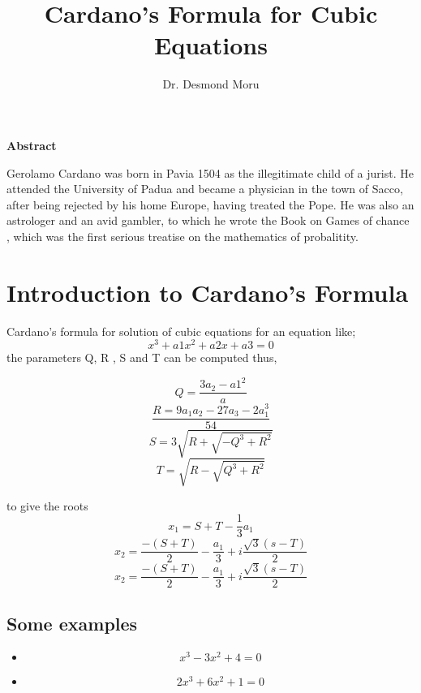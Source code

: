\documentclass{article}
\begin{document}
	\author{Dr. Desmond Moru}
	\title{Cardano's Formula for Cubic Equations}
	\maketitle
	
	
	
	\begin{center}
		\textbf{Abstract}
	\end{center}
	Gerolamo Cardano was born in Pavia 1504 as the illegitimate child of a jurist. He attended the University of Padua and became a physician in the town of Sacco, after being rejected by his home Europe, having treated the Pope. He was also an astrologer and an avid gambler, to which he wrote the Book on Games of chance , which was the first serious treatise on the mathematics of probalitity. \cite{cardanoformula}
	
	\section{ Introduction to Cardano's Formula}
	Cardano's formula for solution of cubic equations for an equation like;
	\begin{equation}
		x^3 + a1x^2 + a2x + a3 = 0
	\end{equation}
	the parameters Q, R , S and T can be computed thus,
	
	\begin{equation}
		Q= \frac{3a_{2} - a{1}^2}{a}
	\end{equation}
\begin{equation}
\frac{R=9a_{1}a_{2}-27a_{3}-2a_{1}^3}{54}	
\end{equation}
\begin{equation}
	S=3\sqrt{R +\sqrt{-Q^3 + R^2}}
\end{equation}
\begin{equation}
	T=\sqrt{R-\sqrt{Q^3 + R^2}}
\end{equation}

to give the roots
\begin{equation}
	x_{1}= S + T -\frac{1}{3}a_{1}
\end{equation}
\begin{equation}
		x_{2} =\frac{-(S +T)}{2} -\frac{a_{1}}{3} + i\frac{\sqrt{3}(s-T)}{2}
\end{equation}
\begin{equation}
	x_{2} =\frac{-(S +T)}{2} -\frac{a_{1}}{3} + i\frac{\sqrt{3}(s-T)}{2}
\end{equation}
\subsection{Some examples}

\begin{itemize}
\item	\begin{equation}
		x^3 - 3x^2 + 4 =0
	\end{equation}
\item\begin{equation}
	2x^3 + 6x^2 + 1 =0
\end{equation}
\end{itemize}



\end{document}
